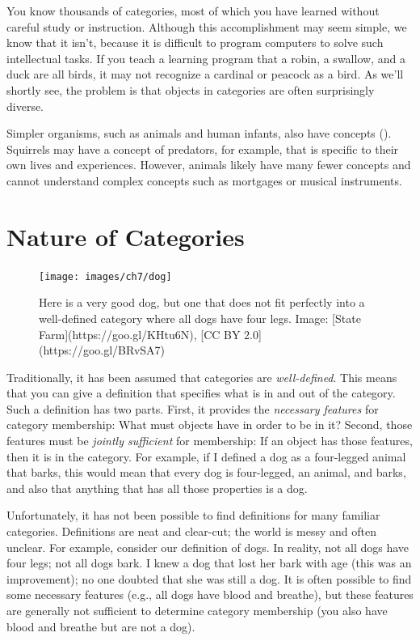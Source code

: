 \documentclass[
]{krantz}
\begin{document}
You know thousands of categories, most of which you have learned without careful study or instruction. Although this accomplishment may seem simple, we know that it isn't, because it is difficult to program computers to solve such intellectual tasks. If you teach a learning program that a robin, a swallow, and a duck are all birds, it may not recognize a cardinal or peacock as a bird. As we'll shortly see, the problem is that objects in categories are often surprisingly diverse.

Simpler organisms, such as animals and human infants, also have concepts (). Squirrels may have a concept of predators, for example, that is specific to their own lives and experiences. However, animals likely have many fewer concepts and cannot understand complex concepts such as mortgages or musical instruments.

\section{Nature of Categories}\label{nature-of-categories}

\begin{figure}

{\centering \texttt{[image: images/ch7/dog]} 

}

\caption{Here is a very good dog, but one that does not fit perfectly into a well-defined category where all dogs have four legs. Image: [State Farm](https://goo.gl/KHtu6N), [CC BY 2.0](https://goo.gl/BRvSA7)}\label{fig:dog}
\end{figure}

Traditionally, it has been assumed that categories are \emph{well-defined}. This means that you can give a definition that specifies what is in and out of the category. Such a definition has two parts. First, it provides the \emph{necessary features} for category membership: What must objects have in order to be in it? Second, those features must be \emph{jointly sufficient} for membership: If an object has those features, then it is in the category. For example, if I defined a dog as a four-legged animal that barks, this would mean that every dog is four-legged, an animal, and barks, and also that anything that has all those properties is a dog.

Unfortunately, it has not been possible to find definitions for many familiar categories. Definitions are neat and clear-cut; the world is messy and often unclear. For example, consider our definition of dogs. In reality, not all dogs have four legs; not all dogs bark. I knew a dog that lost her bark with age (this was an improvement); no one doubted that she was still a dog. It is often possible to find some necessary features (e.g., all dogs have blood and breathe), but these features are generally not sufficient to determine category membership (you also have blood and breathe but are not a dog).
\end{document}
